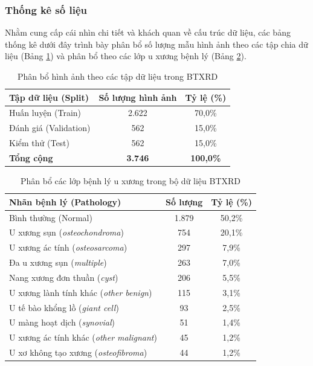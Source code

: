 \subsubsection{Thống kê số liệu}
Nhằm cung cấp cái nhìn chi tiết và khách quan về cấu trúc dữ liệu, các bảng thống kê dưới đây trình bày phân bổ số lượng mẫu hình ảnh theo các tập chia dữ liệu (Bảng \ref{tab:btxrd_splits}) và phân bổ theo các lớp u xương bệnh lý (Bảng \ref{tab:btxrd_pathologies}).

\begin{table}[htbp]
\centering
\small
\begin{tabular}{|l|c|c|}
\hline
\textbf{Tập dữ liệu (Split)} & \textbf{Số lượng hình ảnh} & \textbf{Tỷ lệ (\%)} \\ \hline
Huấn luyện (Train)            & 2.622                       & 70,0\%              \\ \hline
Đánh giá (Validation)         & 562                         & 15,0\%              \\ \hline
Kiểm thử (Test)               & 562                         & 15,0\%              \\ \hline
\textbf{Tổng cộng}            & \textbf{3.746}              & \textbf{100,0\%}    \\ \hline
\end{tabular}
\caption{Phân bổ hình ảnh theo các tập dữ liệu trong BTXRD}
\label{tab:btxrd_splits}
\end{table}

\begin{table}[htbp]
\centering
\small
\begin{tabular}{|l|c|c|}
\hline
\textbf{Nhãn bệnh lý (Pathology)} & \textbf{Số lượng} & \textbf{Tỷ lệ (\%)} \\ \hline
Bình thường (Normal)              & 1.879              & 50,2\%              \\ \hline
U xương sụn (\textit{osteochondroma}) & 754            & 20,1\%              \\ \hline
U xương ác tính (\textit{osteosarcoma}) & 297          & 7,9\%               \\ \hline
Đa u xương sụn (\textit{multiple}) & 263               & 7,0\%               \\ \hline
Nang xương đơn thuần (\textit{cyst}) & 206             & 5,5\%               \\ \hline
U xương lành tính khác (\textit{other benign}) & 115   & 3,1\%               \\ \hline
U tế bào khổng lồ (\textit{giant cell}) & 93           & 2,5\%               \\ \hline
U màng hoạt dịch (\textit{synovial}) & 51              & 1,4\%               \\ \hline
U xương ác tính khác (\textit{other malignant}) & 45  & 1,2\%               \\ \hline
U xơ không tạo xương (\textit{osteofibroma}) & 44     & 1,2\%               \\ \hline
\end{tabular}
\caption{Phân bổ các lớp bệnh lý u xương trong bộ dữ liệu BTXRD}
\label{tab:btxrd_pathologies}
\end{table}


